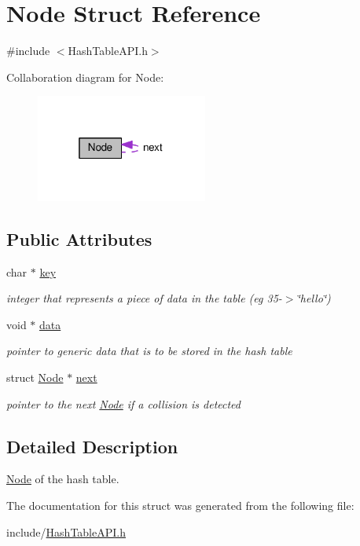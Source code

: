\hypertarget{structNode}{}\section{Node Struct Reference}
\label{structNode}


{\ttfamily \#include $<$Hash\+Table\+A\+P\+I.\+h$>$}



Collaboration diagram for Node\+:
\nopagebreak
\begin{figure}[H]
\begin{center}
\leavevmode
\includegraphics[width=160pt]{structNode__coll__graph}
\end{center}
\end{figure}
\subsection*{Public Attributes}
\begin{DoxyCompactItemize}
\item 
\mbox{\label{structNode_ad88c9a757bfafd5ff265e0837b150056}} 
char $\ast$ \hyperlink{structNode_ad88c9a757bfafd5ff265e0837b150056}{key}
\begin{DoxyCompactList}\small\item\em integer that represents a piece of data in the table (eg 35-\/$>$\char`\"{}hello\char`\"{}) \end{DoxyCompactList}\item 
\mbox{\label{structNode_a38b733496e3eff5e0b4fcb11cd9b866a}} 
void $\ast$ \hyperlink{structNode_a38b733496e3eff5e0b4fcb11cd9b866a}{data}
\begin{DoxyCompactList}\small\item\em pointer to generic data that is to be stored in the hash table \end{DoxyCompactList}\item 
\mbox{\label{structNode_af67b110ca1a258b793bf69d306929b22}} 
struct \hyperlink{structNode}{Node} $\ast$ \hyperlink{structNode_af67b110ca1a258b793bf69d306929b22}{next}
\begin{DoxyCompactList}\small\item\em pointer to the next \hyperlink{structNode}{Node} if a collision is detected \end{DoxyCompactList}\end{DoxyCompactItemize}


\subsection{Detailed Description}
\hyperlink{structNode}{Node} of the hash table. 

The documentation for this struct was generated from the following file\+:\begin{DoxyCompactItemize}
\item 
include/\hyperlink{HashTableAPI_8h}{Hash\+Table\+A\+P\+I.\+h}\end{DoxyCompactItemize}
